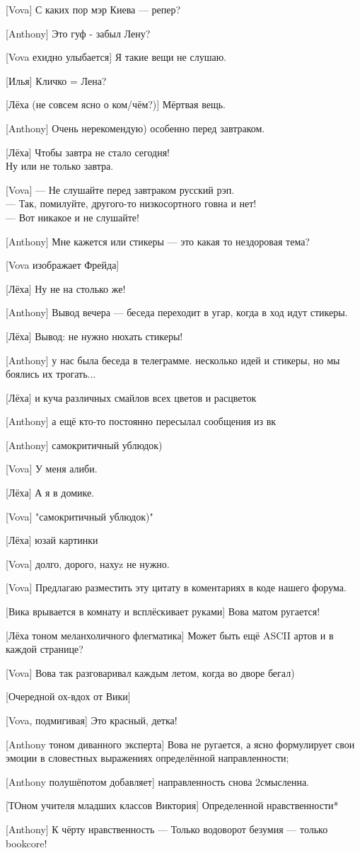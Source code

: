 [Vova]
С каких пор мэр Киева — репер?


[Anthony]
Это гуф - забыл Лену?


[Vova ехидно улыбается]
Я такие вещи не слушаю.


[Илья]
Кличко = Лена?


[Лёха (не совсем ясно о ком/чём?)]
Мёртвая вещь.


[Anthony]
Очень нерекомендую) особенно перед завтраком.


[Лёха]
Чтобы завтра не стало сегодня!\\
Ну или не только завтра.


[Vova]
— Не слушайте перед завтраком русский рэп.\\
— Так, помилуйте, другого-то низкосортного говна и нет!\\
— Вот никакое и не слушайте!


[Anthony]
Мне кажется или стикеры --- это какая то нездоровая тема?


[Vova изображает Фрейда]


[Лёха]
Ну не на столько же!


[Anthony]
Вывод вечера --- беседа переходит в угар, когда в ход идут стикеры.


[Лёха]
Вывод: не нужно нюхать стикеры!


[Anthony]
у нас была беседа в телеграмме. несколько идей и стикеры, но мы боялись их трогать...


[Лёха]
и куча различных смайлов всех цветов и расцветок


[Anthony]
а ещё кто-то постоянно пересылал сообщения из вк


[Anthony]
самокритичный ублюдок)


[Vova]
У меня алиби.


[Лёха]
А я в домике.


[Vova]
"самокритичный ублюдок)"



[Лёха]
юзай картинки


[Vova]
долго, дорого, нахуz не нужно.


[Vova]
Предлагаю разместить эту цитату в коментариях в коде нашего форума.


[Вика врывается в комнату и всплёскивает руками]
Вова матом ругается!


[Лёха тоном меланхоличного флегматика]
Может быть ещё ASCII артов и в каждой странице?


[Vova]
Вова так разговаривал каждым летом, когда во дворе бегал)


[Очередной ох-вдох от Вики]


[Vova, подмигивая]
Это красный, детка!


[Anthony тоном диванного эксперта]
Вова не ругается, а ясно формулирует свои эмоции в словестных выражениях определённой направленности;


[Anthony полушёпотом добавляет]
направленность снова 2смысленна.


[ТОном учителя младших классов Виктория]
Определенной нравственности*


[Anthony]
К чёрту нравственность --- Только водоворот безумия --- только bookcore!

